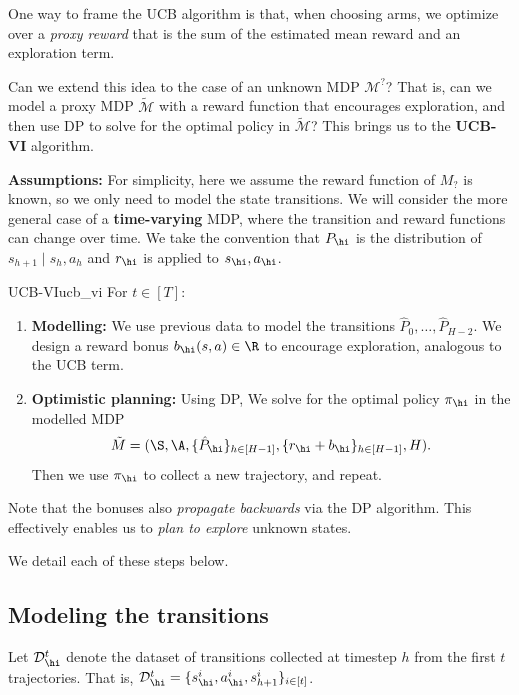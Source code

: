 \documentclass[\main/main]{subfiles}
\begin{document}
One way to frame the UCB algorithm is that, when choosing arms, we optimize over a \emph{proxy reward} that is the sum of the estimated mean reward and an exploration term.

Can we extend this idea to the case of an unknown MDP $\mathcal{M}^{?}$? That is, can we model a proxy MDP $\tilde{\mathcal{M}}$ with a reward function that encourages exploration, and then use DP to solve for the optimal policy in $\tilde{\mathcal{M}}$?
This brings us to the \textbf{UCB-VI} algorithm.

\textbf{Assumptions:} For simplicity, here we assume the reward function of $M_{?}$ is known, so we only need to model the state transitions. We will consider the more general case of a \textbf{time-varying} MDP, where the transition and reward functions can change over time. We take the convention that $P_\hi$ is the distribution of $s_{h+1} \mid s_{h}, a_{h}$ and $r_\hi$ is applied to $s_\hi, a_\hi$.

\begin{definition}{UCB-VI}{ucb_vi}
For $t \in [T]$:
\begin{enumerate}
    \item \textbf{Modelling:} We use previous data to model the transitions $\hat{P}_0, \dots, \hat{P}_{H-2}$. We design a reward bonus $b_\hi(s, a) \in \R$ to encourage exploration, analogous to the UCB term.
    \item \textbf{Optimistic planning:} Using DP, We solve for the optimal policy $\pi_\hi$ in the modelled MDP \[ \tilde{M} = (\S, \A, \{ \hat{P}_\hi \}_{h \in [H-1]}, \{ r_\hi + b_\hi \}_{h \in [H-1]}, H). \] Then we use $\pi_\hi$ to collect a new trajectory, and repeat.
\end{enumerate}
\end{definition}

Note that the bonuses also \emph{propagate backwards} via the DP algorithm.
This effectively enables us to \emph{plan to explore} unknown states.

We detail each of these steps below.

\subsection{Modeling the transitions}

Let $\mathcal{D}_\hi^t$ denote the dataset of transitions collected at timestep $h$ from the first $t$ trajectories. That is, $\mathcal{D}_\hi^t = \{ s_\hi^i, a_\hi^i, s_{h+1}^i \}_{i \in [t]}$.
\end{document}
